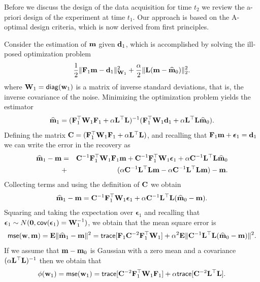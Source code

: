 \documentclass[11pt]{article}
\newcommand{\bfC}	{{\bf{C}}}
\newcommand{\bfE}	{{\bf{E}}}
\newcommand{\bfF}	{{\bf{F}}}
\newcommand{\bfL}	{{\bf{L}}}
\newcommand{\bfW}	{{\bf{W}}}
\newcommand{\bfd}	{{\bf{d}}}
\newcommand{\bfm}	{{\bf{m}}}
\newcommand{\bfw}	{{\bf{w}}}
\newcommand{\hf}        {{\frac 12}}
\newcommand{\bfepsilon} {{\boldsymbol \epsilon}}
\newcommand{\LtL}       { \bfL^{\top}\bfL}
\newcommand {\zero}  { {\bf 0} }
\renewcommand{\hf}		 {\frac12}
\newcommand{\bfmhat}    {{\widehat{\bfm}}}
\begin{document}
Before we discuss the design of the data acquisition for time $t_{2}$
 we review the a-priori design of the experiment at time $t_{1}$. Our approach is based
 on the  A-optimal design criteria, which is now derived from first principles.
 
Consider  the estimation of $\bfm$ given $\bfd_{1}$, which is accomplished by solving the ill-posed optimization problem
\begin{eqnarray*}
\label{mest1}
\hf \| \bfF_{1} \bfm - \bfd_{1}\|^{2}_{\bfW_{1}} + {\frac {\alpha} 2}
\|\bfL (\bfm - \bfmhat_{0}) \|^{2}_2. 
\end{eqnarray*}
where $\bfW_{1} = {\sf diag}(\bfw_{1})$ is a matrix of inverse standard deviations, 
that is, the inverse covariance of the noise.
Minimizing the  optimization problem yields the estimator
\begin{eqnarray}
\label{mest}
\widehat \bfm_{1} = (\bfF_{1}^{\top} \bfW_{1}\bfF_{1} + \alpha \bfL^{\top} \bfL)^{-1} (\bfF_{1}^{\top} \bfW_{1} \bfd_{1}
+ \alpha \LtL \bfmhat_{0}).
\end{eqnarray}
Defining the matrix $\bfC = (\bfF_{1}^{\top} \bfW_{1}\bfF_{1} + \alpha \LtL)$, and recalling that $\bfF_1\bfm + \bfepsilon_1 = \bfd_1$ we can write
the error in the recovery as
\begin{eqnarray}
\bfmhat_1 -\bfm &=& \bfC^{-1} \bfF_{1}^{\top} \bfW_{1}\bfF_{1} \bfm + \bfC^{-1} \bfF_{1}^{\top} \bfW_{1}\bfepsilon_1 + \alpha
\bfC^{-1} \LtL \bfmhat_{0} \\
\nonumber
&+& (\alpha \bfC^{-1} \LtL\bfm
- \alpha \bfC^{-1} \LtL \bfm) 
 -\bfm.
\end{eqnarray}
Collecting terms and using the definition of $\bfC$ we obtain
\begin{eqnarray}
\label{diffmod}
\bfmhat_1 -\bfm = \bfC^{-1} \bfF_{1}^{\top} \bfW_{1} \bfepsilon_1 + \alpha \bfC^{-1} \LtL (\bfmhat_{0} - \bfm).
\end{eqnarray}
Squaring and taking the expectation over $\bfepsilon_1$ and recalling that $ \bfepsilon_1 \sim N(\zero,{\sf cov}(\bfepsilon_1) = \bfW_{1}^{-1})$, we obtain that the mean square error is
\begin{eqnarray}
{\sf mse}(\bfw,\bfm) = \bfE\| \bfmhat_1 -\bfm \|^{2} = {\sf trace}[   \bfF_{1} \bfC^{-2} \bfF_{1}^{\top} \bfW_{1}]  + 
\alpha^2 \bfE\| \bfC^{-1} \LtL (\bfmhat_{0} - \bfm) \|^{2}.
\end{eqnarray}
If we assume that $\bfm-\bfm_{0}$ is Gaussian with a zero mean and a covariance
$(\alpha \LtL)^{-1}$ then we obtain that
\begin{eqnarray}
\phi(\bfw_1 ) = {\sf mse}(\bfw_1) = {\sf trace}[    \bfC^{-2} \bfF_{1}^{\top}\bfW_{1}\bfF_{1}]  + 
 \alpha {\sf trace} [\bfC^{-2} \LtL] . 
\end{eqnarray}
\end{document}
